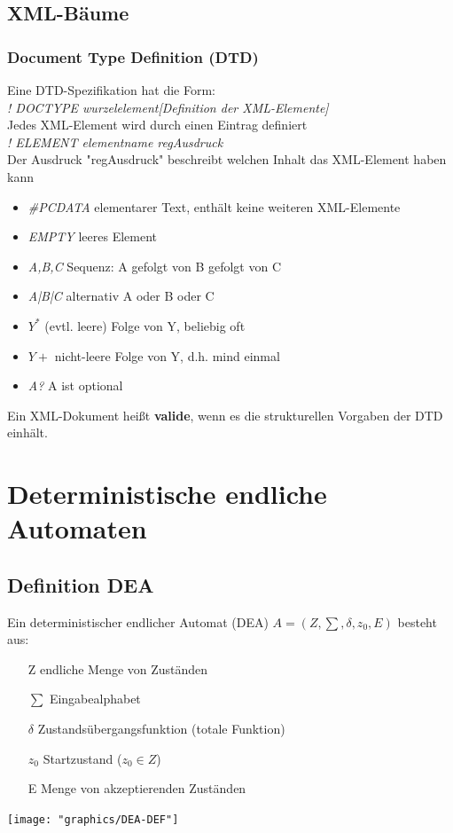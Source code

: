 \documentclass{scrreprt}
\newcommand\tab[1][1cm]{\hspace*{#1}}
\begin{document}
\section{XML-Bäume}
\subsection{Document Type Definition (DTD)}
Eine DTD-Spezifikation hat die Form:
\\\tab  \textit{\textlangle! DOCTYPE wurzelelement[Definition der XML-Elemente]\textrangle}
\\Jedes XML-Element wird durch einen Eintrag definiert
\\\tab \textit{\textlangle! ELEMENT elementname regAusdruck\textrangle}
\\Der Ausdruck "regAusdruck" beschreibt welchen Inhalt das XML-Element haben kann
\begin{itemize}
    \item \textit{\#PCDATA} elementarer Text, enthält keine weiteren XML-Elemente
    \item \textit{EMPTY} leeres Element
    \item \textit{A,B,C} Sequenz: A gefolgt von B gefolgt von C
    \item \textit{A|B|C} alternativ A oder B oder C
    \item \textit{$Y^{*}$} (evtl. leere) Folge von Y, beliebig oft
    \item \textit{$Y+$} nicht-leere Folge von Y, d.h. mind einmal
    \item \textit{A?} A ist optional
\end{itemize}
Ein XML-Dokument heißt \textbf{valide}, wenn es die strukturellen Vorgaben der DTD einhält.
\pagebreak
\chapter{Deterministische endliche Automaten}
\section{Definition DEA}
Ein deterministischer endlicher Automat (DEA) $A=(Z,\sum,\delta,z_{0},E)$ besteht aus:
\begin{itemize}
    \item [Z] endliche Menge von Zuständen
    \item [$\sum$] Eingabealphabet
    \item [$\delta$] Zustandsübergangsfunktion (totale Funktion)
    \item [$z_{0}$] Startzustand ($z_{0} \in Z$)
    \item [E] Menge von akzeptierenden Zuständen
\end{itemize}
\texttt{[image: "graphics/DEA-DEF"]}
\end{document}
